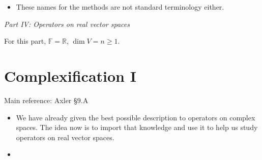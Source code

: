 \documentclass[11pt]{article}
\newcommand{\1}{\mathbf{1}}
\newcommand{\0}{\mathbf{0}}
\newcommand{\C}{\mathbb{C}}
\newcommand{\F}{\mathbb{F}}
\newcommand{\R}{\mathbb{R}}
\renewcommand{\geq}{\geqslant}
\newcommand{\spitem}{\item[$\circ$]}
\begin{document}
{\begin{itemize}
\spitem

These names for the methods are not standard terminology either.

\end{itemize}


\clearpage

\hfil
\emph{\Large Part IV: Operators on real vector spaces}

\medskip

\hfill
For this part,
$\F = \R$, $\dim V = n \geq 1$.

\section{Complexification I}

Main reference:
Axler \S9.A

\begin{itemize}

\item

We have already given the best possible description to operators on complex spaces.
The idea now is to import that knowledge and use it to help us study operators on real vector spaces.

%
%
%
%
%
%
%
%

\item


\end{itemize}}
\end{document}
